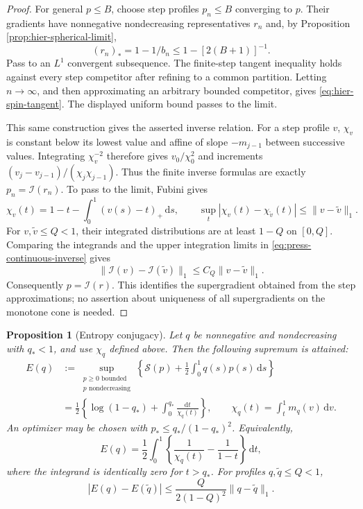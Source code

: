 \documentclass[11pt,a4paper]{article}
\numberwithin{equation}{section}
\newtheorem{proposition}[theorem]{Proposition}
\theoremstyle{definition}
\theoremstyle{remark}
\newcommand{\dd}{\mathrm d}
\begin{document}
\begin{proof}
For general $p\le B$, choose step profiles $p_n\le B$ converging to $p$.
Their gradients have nonnegative nondecreasing representatives $r_n$ and,
by Proposition \ref{prop:hier-spherical-limit},
\[
 (r_n)_*=1-1/b_n\le1-[2(B+1)]^{-1}.
\]
Pass to an $L^1$ convergent subsequence.  The finite-step tangent inequality
holds against every step competitor after refining to a common partition.
Letting $n\to\infty$, and then approximating an arbitrary bounded
competitor, gives \eqref{eq:hier-spin-tangent}.  The displayed uniform bound
passes to the limit.

This same construction gives the asserted inverse relation.  For a step
profile $v$, $\chi_v$ is constant below its lowest value and affine of
slope $-m_{j-1}$ between successive values.  Integrating $\chi_v^{-2}$
therefore gives $v_0/\chi_0^2$ and increments
$(v_j-v_{j-1})/(\chi_j\chi_{j-1})$.  Thus the finite inverse formulas
are exactly $p_n=\mathcal I(r_n)$.  To pass to the limit, Fubini gives
\begin{equation}\label{eq:hier-chi-quantile}
 \chi_v(t)=1-t-\int_0^1(v(s)-t)_+\,\dd s,
 \qquad
 \sup_t|\chi_v(t)-\chi_{\widetilde v}(t)|
       \le\|v-\widetilde v\|_1.
\end{equation}
For $v,\widetilde v\le Q<1$, their integrated distributions are at least
$1-Q$ on $[0,Q]$.  Comparing the integrands and the upper integration
limits in \eqref{eq:press-continuous-inverse} gives
\[
 \|\mathcal I(v)-\mathcal I(\widetilde v)\|_1
       \le C_Q\|v-\widetilde v\|_1.
\]
Consequently $p=\mathcal I(r)$.  This identifies the supergradient
obtained from the step approximations; no assertion about uniqueness of
all supergradients on the monotone cone is needed.
\end{proof}

\begin{proposition}[Entropy conjugacy]
\label{prop:hier-entropy-conjugacy}
Let $q$ be nonnegative and nondecreasing with $q_*<1$, and use $\chi_q$
defined above.  Then the following supremum is attained:
\begin{equation}
 \begin{split}
 E(q)&:=\sup_{\substack{p\ge0\text{ bounded}\\p\text{ nondecreasing}}}
       \left\{\mathcal S(p)+\frac12\int_0^1q(s)p(s)\,\dd s\right\}\\
 &=\frac12\left\{\log(1-q_*)+
                       \int_0^{q_*}\frac{\dd t}{\chi_q(t)}\right\},
 \qquad \chi_q(t)=\int_t^1m_q(v)\,\dd v.
 \end{split}
 \label{eq:src3}
\end{equation}
An optimizer may be chosen with
$p_*\le q_*/(1-q_*)^2$.  Equivalently,
\begin{equation}
 E(q)=\frac12\int_0^1
       \left\{\frac1{\chi_q(t)}-\frac1{1-t}\right\}\,\dd t,
 \label{eq:hier-entropy-integral}
\end{equation}
where the integrand is identically zero for $t>q_*$.  For profiles
$q,\widetilde q\le Q<1$,
\begin{equation}
 |E(q)-E(\widetilde q)|
 \le\frac{Q}{2(1-Q)^2}\|q-\widetilde q\|_1.
 \label{eq:hier-entropy-continuity}
\end{equation}
\end{proposition}
\end{document}

